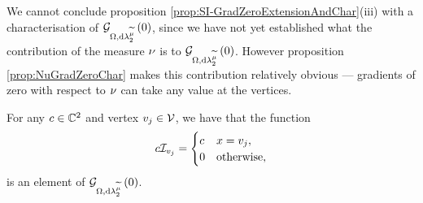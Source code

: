 We cannot conclude proposition \ref{prop:SI-GradZeroExtensionAndChar}(iii) with a characterisation of $\mathcal{G}_{ \Omega, \mathrm{d}\lambda_2^{\widetilde{\mu}}}\left( 0 \right)$, since we have not yet established what the contribution of the measure $\nu$ is to $\mathcal{G}_{ \Omega, \mathrm{d}\lambda_2^{\widetilde{\mu}}}\left( 0 \right)$.
However proposition \ref{prop:NuGradZeroChar} makes this contribution relatively obvious --- gradients of zero with respect to $\nu$ can take any value at the vertices.
\begin{prop} \label{prop:SI-MassMesGradZeroExtension}
	For any $c\in\mathbb{C}^2$ and vertex $v_j\in\mathcal{V}$, we have that the function
	\begin{align} \label{eq:MassMesExtension-VertexFunction}
		c\mathcal{I}_{v_j} = \begin{cases} c & x=v_j, \\ 0 & \text{otherwise}, \end{cases}
	\end{align}
	is an element of $\mathcal{G}_{ \Omega, \mathrm{d}\lambda_2^{\widetilde{\mu}}}\left( 0 \right)$.
\end{prop}

